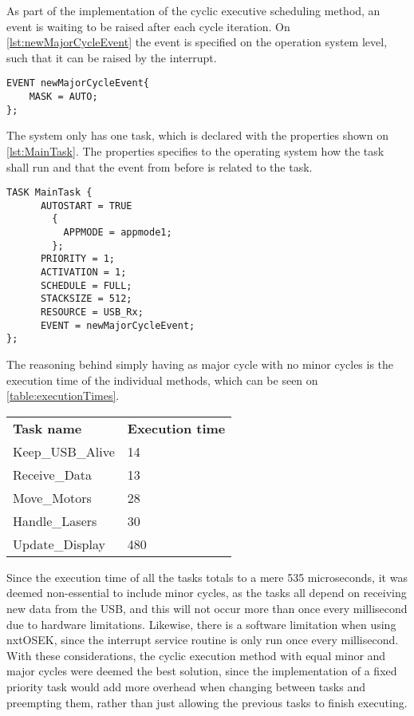 As part of the implementation of the cyclic executive scheduling method, an event is waiting to be raised after each cycle iteration.
On \autoref{lst:newMajorCycleEvent} the event is specified on the operation system level, such that it can be raised by the interrupt.
\begin{lstlisting}[language=CSharp,label={lst:newMajorCycleEvent},caption={newMajorCycleEvent event from nxt.oil}]
EVENT newMajorCycleEvent{
    MASK = AUTO;
};
\end{lstlisting}

The system only has one task, which is declared with the properties shown on \autoref{lst:MainTask}.
The properties specifies to the operating system how the task shall run and that the event from before is related to the task.
\begin{lstlisting}[language=CSharp,label={lst:MainTaskoil},caption={MainTaks task from nxt.oil}]
    TASK MainTask {
      AUTOSTART = TRUE
        {
          APPMODE = appmode1;
        };
      PRIORITY = 1;
      ACTIVATION = 1;
      SCHEDULE = FULL;
      STACKSIZE = 512;
      RESOURCE = USB_Rx;
      EVENT = newMajorCycleEvent;
};
\end{lstlisting}

The reasoning behind simply having as major cycle with no minor cycles is the execution time of the individual methods, which can be seen on \autoref{table:executionTimes}.

\begin{table}[tbp]
\begin{tabular}{ll}
\textbf{Task name}  & \textbf{Execution time} \\
Keep\_USB\_Alive    & 14                            \\
Receive\_Data       & 13                            \\
Move\_Motors        & 28                            \\
Handle\_Lasers      & 30                            \\
Update\_Display     & 480                           \\
\end{tabular}
\end{table}\label{table:executionTimes}

Since the execution time of all the tasks totals to a mere 535 microseconds, it was deemed non-essential to include minor cycles, as the tasks all depend on receiving new data from the USB, and this will not occur more than once every millisecond due to hardware limitations.
Likewise, there is a software limitation when using nxtOSEK, since the interrupt service routine is only run once every millisecond.
With these considerations, the cyclic execution method with equal minor and major cycles were deemed the best solution, since the implementation of a fixed priority task would add more overhead when changing between tasks and preempting them, rather than just allowing the previous tasks to finish executing.

